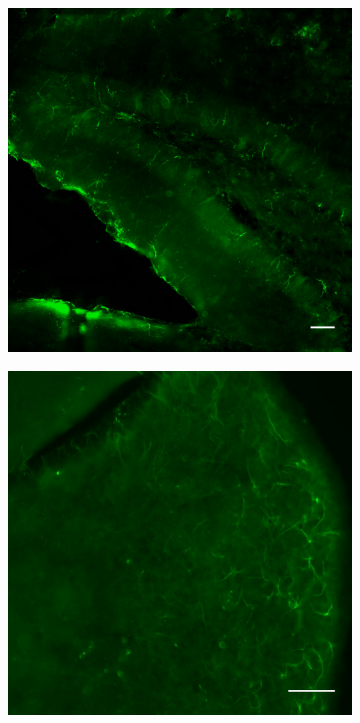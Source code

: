 \begin{figure}[h]
\begin{subfigure}[h]{0.245\textwidth}
		\end{subfigure}
		\begin{subfigure}[h]{0.245\textwidth}
			\caption{}
			\label{fig:locaMuSKdg}
			\includegraphics[width=\textwidth]{./Images/Immuno/Musk/MuSK_dg_50um.jpg}
		\end{subfigure}
		\begin{subfigure}[h]{0.245\textwidth}
			\caption{}
			\label{fig:locaMuSKhb}
			\includegraphics[width=\textwidth]{./Images/Immuno/Musk/MuSK_hb_50um.jpg}

\end{subfigure}
\end{figure}
